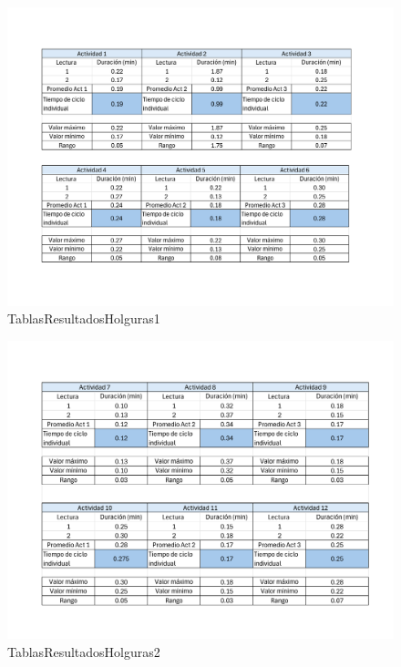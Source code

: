     \begin{figure}[H]
        \centering
        \includegraphics[scale=0.300]{21/img/tablasResultadosHolguras1.pdf}
        \caption{TablasResultadosHolguras1}
        \label{fig:tablasResultadosHolguras1}
    \end{figure}
    \begin{figure}[H]
        \centering
        \includegraphics[scale=0.300]{21/img/tablasResultadosHolguras2.pdf}
        \caption{TablasResultadosHolguras2}
        \label{fig:tablasResultadosHolguras2}
    \end{figure}
